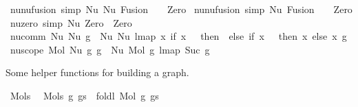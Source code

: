 \begin{isabellebody}
\isanewline
{\isacharbar}{\kern0pt}\ nu{\isacharunderscore}{\kern0pt}nu{\isacharunderscore}{\kern0pt}fusion{}\ {\isacharbrackleft}{\kern0pt}simp{\isacharbrackright}{\kern0pt}{\isacharcolon}{\kern0pt}\ {\isachardoublequoteopen}Nu\ {\isacharparenleft}{\kern0pt}Nu\ {\isacharparenleft}{\kern0pt}Fusion\ {}\ {}{\isacharparenright}{\kern0pt}{\isacharparenright}{\kern0pt}\ {\isasymsimeq}\ Zero{\isachardoublequoteclose}\isanewline
{\isacharbar}{\kern0pt}\ nu{\isacharunderscore}{\kern0pt}nu{\isacharunderscore}{\kern0pt}fusion{}\ {\isacharbrackleft}{\kern0pt}simp{\isacharbrackright}{\kern0pt}{\isacharcolon}{\kern0pt}\ {\isachardoublequoteopen}Nu\ {\isacharparenleft}{\kern0pt}Fusion\ {}\ {}{\isacharparenright}{\kern0pt}\ {\isasymsimeq}\ Zero{\isachardoublequoteclose}\isanewline
\isanewline
\isanewline
{\isacharbar}{\kern0pt}\ nu{\isacharunderscore}{\kern0pt}zero\ {\isacharbrackleft}{\kern0pt}simp{\isacharbrackright}{\kern0pt}{\isacharcolon}{\kern0pt}\ {\isachardoublequoteopen}Nu\ Zero\ {\isasymsimeq}\ Zero{\isachardoublequoteclose}\isanewline
\isanewline
\isanewline
{\isacharbar}{\kern0pt}\ nu{\isacharunderscore}{\kern0pt}comm{\isacharcolon}{\kern0pt}\ {\isachardoublequoteopen}Nu\ {\isacharparenleft}{\kern0pt}Nu\ g{\isacharparenright}{\kern0pt}\ {\isasymsimeq}\ Nu\ {\isacharparenleft}{\kern0pt}Nu\ {\isacharparenleft}{\kern0pt}lmap\ {\isacharparenleft}{\kern0pt}{\isasymlambda}x{\isachardot}{\kern0pt}\ if\ x\ {\isacharequal}{\kern0pt}\ {}\ then\ {}\ else\ if\ x\ {\isacharequal}{\kern0pt}\ {}\ then\ x\ else\ x{\isacharparenright}{\kern0pt}\ g{\isacharparenright}{\kern0pt}{\isacharparenright}{\kern0pt}{\isachardoublequoteclose}\isanewline
\isanewline
\isanewline
{\isacharbar}{\kern0pt}\ nu{\isacharunderscore}{\kern0pt}scope{\isacharcolon}{\kern0pt}\ {\isachardoublequoteopen}Mol\ {\isacharparenleft}{\kern0pt}Nu\ g{}{\isacharparenright}{\kern0pt}\ g{}\ {\isasymsimeq}\ Nu\ {\isacharparenleft}{\kern0pt}Mol\ g{}\ {\isacharparenleft}{\kern0pt}lmap\ Suc\ g{}{\isacharparenright}{\kern0pt}{\isacharparenright}{\kern0pt}{\isachardoublequoteclose}%
\begin{isamarkuptext}%
Some helper functions for building a graph.%
\end{isamarkuptext}\isamarkuptrue%
\isamarkupfalse%
\ Mols{}{\isacharcolon}{\kern0pt}\isanewline
\ \ {\isachardoublequoteopen}Mols{}\ g\ gs\ {\isacharequal}{\kern0pt}\ foldl\ Mol\ g\ gs{\isachardoublequoteclose}\isanewline

\end{isabellebody}
